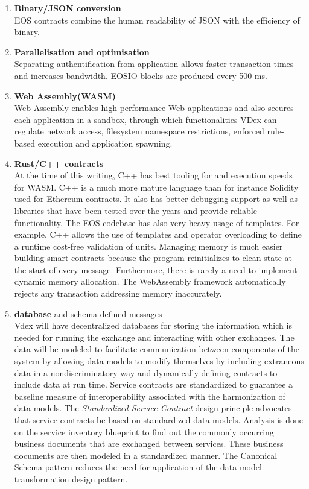 \documentclass[]{article}
\begin{document}
{\begin{enumerate}
	\item\textbf{ Binary/JSON conversion} \\
	EOS contracts combine the human readability of JSON with the efficiency of binary. \\
	
	\item \textbf{Parallelisation and optimisation\\ } 
	Separating authentification from application allows faster transaction times and increases bandwidth.
	EOSIO blocks are produced every 500 ms.
	
	\item \textbf{Web Assembly(WASM)}   \\
	Web Assembly enables high-performance Web applications and also secures each application in a sandbox, through which functionalities VDex can regulate network access, filesystem namespace restrictions, enforced rule-based execution and application spawning. 
	
	\item \textbf{Rust/C++ contracts\\}
	At the time of this writing,
	C++ has best tooling for and execution speeds for WASM.
	C++ is a much more mature language than for instance Solidity used for Ethereum contracts.
	It also has better debugging support as well as libraries that have been tested over the years and provide reliable functionality. 
	The EOS codebase has also very heavy usage of templates.
	For example, C++ allows the use of templates and operator overloading to define a runtime cost-free validation of units.
	Managing memory is much easier building smart contracts because the program reinitializes to clean state at the start of every message. 
	Furthermore, there is rarely a need to implement dynamic memory allocation. 
	The WebAssembly framework automatically rejects any transaction addressing memory inaccurately.
	
	\item \textbf{database} and schema defined messages\\
	
	Vdex will have decentralized databases for storing the information which is needed for running the exchange and interacting with other exchanges.
	The data will be modeled to facilitate communication between components of the system by allowing data models to modify themselves by including extraneous data in a nondiscriminatory way and dynamically defining contracts to include data at run time. 
	Service contracts are standardized to guarantee a baseline measure of interoperability associated with the harmonization of data models.
	The \textit{Standardized Service Contract} design principle advocates that service contracts be based on standardized data models. 
	Analysis is done on the service inventory blueprint to find out the commonly occurring business documents that are exchanged between services. 
	These business documents are then modeled in a standardized manner. 
	The Canonical Schema pattern reduces the need for application of the data model transformation design pattern.
	\cite{1}
	

\end{enumerate}}
\end{document}
